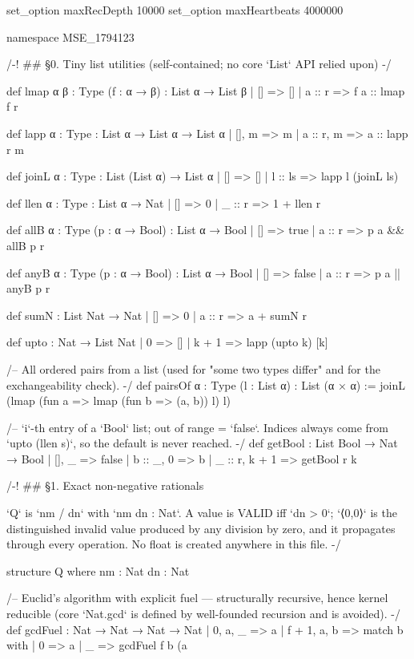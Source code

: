 \documentclass[11pt]{article}
\begin{document}
\begin{Vlean}
set_option maxRecDepth 10000
set_option maxHeartbeats 4000000

namespace MSE_1794123

/-! ## §0. Tiny list utilities (self-contained; no core `List` API relied upon) -/

def lmap {α β : Type} (f : α → β) : List α → List β
  | [] => []
  | a :: r => f a :: lmap f r

def lapp {α : Type} : List α → List α → List α
  | [], m => m
  | a :: r, m => a :: lapp r m

def joinL {α : Type} : List (List α) → List α
  | [] => []
  | l :: ls => lapp l (joinL ls)

def llen {α : Type} : List α → Nat
  | [] => 0
  | _ :: r => 1 + llen r

def allB {α : Type} (p : α → Bool) : List α → Bool
  | [] => true
  | a :: r => p a && allB p r

def anyB {α : Type} (p : α → Bool) : List α → Bool
  | [] => false
  | a :: r => p a || anyB p r

def sumN : List Nat → Nat
  | [] => 0
  | a :: r => a + sumN r

def upto : Nat → List Nat
  | 0 => []
  | k + 1 => lapp (upto k) [k]

/-- All ordered pairs from a list (used for "some two types differ" and for the
exchangeability check). -/
def pairsOf {α : Type} (l : List α) : List (α × α) :=
  joinL (lmap (fun a => lmap (fun b => (a, b)) l) l)

/-- `i`-th entry of a `Bool` list; out of range = `false`.  Indices always come from
`upto (llen s)`, so the default is never reached. -/
def getBool : List Bool → Nat → Bool
  | [], _ => false
  | b :: _, 0 => b
  | _ :: r, k + 1 => getBool r k

/-! ## §1. Exact non-negative rationals

`Q` is `nm / dn` with `nm dn : Nat`.  A value is VALID iff `dn > 0`; `⟨0,0⟩` is the
distinguished invalid value produced by any division by zero, and it propagates through
every operation.  No float is created anywhere in this file. -/

structure Q where
  nm : Nat
  dn : Nat

/-- Euclid's algorithm with explicit fuel — structurally recursive, hence kernel
reducible (core `Nat.gcd` is defined by well-founded recursion and is avoided). -/
def gcdFuel : Nat → Nat → Nat → Nat
  | 0, a, _ => a
  | f + 1, a, b =>
      match b with
      | 0 => a
      | _ => gcdFuel f b (a %


\end{Vlean}
\end{document}
